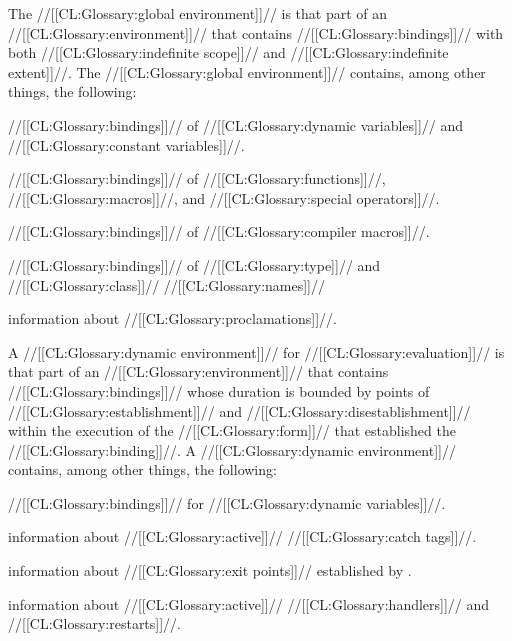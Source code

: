 
The //[[CL:Glossary:global environment]]// is that part of an //[[CL:Glossary:environment]]//
that contains //[[CL:Glossary:bindings]]// with both //[[CL:Glossary:indefinite scope]]// 
and //[[CL:Glossary:indefinite extent]]//.
The //[[CL:Glossary:global environment]]// contains, among other things, the following:

\beginlist
\item{\bull} //[[CL:Glossary:bindings]]// of //[[CL:Glossary:dynamic variables]]// and //[[CL:Glossary:constant variables]]//.
\item{\bull} //[[CL:Glossary:bindings]]// of //[[CL:Glossary:functions]]//, //[[CL:Glossary:macros]]//, and //[[CL:Glossary:special operators]]//.
\item{\bull}%
%
 //[[CL:Glossary:bindings]]// of //[[CL:Glossary:compiler macros]]//.

\item{\bull} //[[CL:Glossary:bindings]]// of //[[CL:Glossary:type]]// and //[[CL:Glossary:class]]// //[[CL:Glossary:names]]//
\item{\bull} information about //[[CL:Glossary:proclamations]]//.
\endlist

\endsubsubsection%


A //[[CL:Glossary:dynamic environment]]// for //[[CL:Glossary:evaluation]]// is that part of an
//[[CL:Glossary:environment]]// that contains //[[CL:Glossary:bindings]]// whose duration
is bounded by points of //[[CL:Glossary:establishment]]// and //[[CL:Glossary:disestablishment]]// 
within the execution of the //[[CL:Glossary:form]]// that
established the //[[CL:Glossary:binding]]//.
A //[[CL:Glossary:dynamic environment]]// contains, among other things, the following:

\beginlist
\item{\bull} //[[CL:Glossary:bindings]]// for //[[CL:Glossary:dynamic variables]]//.
\item{\bull} information about //[[CL:Glossary:active]]// //[[CL:Glossary:catch tags]]//.
\item{\bull} information about //[[CL:Glossary:exit points]]// established by .
\item{\bull} information about //[[CL:Glossary:active]]// //[[CL:Glossary:handlers]]// and //[[CL:Glossary:restarts]]//.
\endlist


